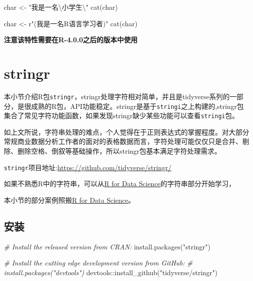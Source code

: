 \documentclass[
]{book}
\newenvironment{Shaded}{\begin{snugshade}}{\end{snugshade}}
\newcommand{\CommentTok}[1]{\textcolor[rgb]{0.56,0.35,0.01}{\textit{#1}}}
\newcommand{\FunctionTok}[1]{\textcolor[rgb]{0.00,0.00,0.00}{#1}}
\newcommand{\NormalTok}[1]{#1}
\newcommand{\OtherTok}[1]{\textcolor[rgb]{0.56,0.35,0.01}{#1}}
\newcommand{\SpecialCharTok}[1]{\textcolor[rgb]{0.00,0.00,0.00}{#1}}
\newcommand{\StringTok}[1]{\textcolor[rgb]{0.31,0.60,0.02}{#1}}
\begin{document}
\begin{Shaded}
\begin{Highlighting}[]
\NormalTok{char }\OtherTok{\textless{}{-}} \StringTok{"我是一名}\SpecialCharTok{\textbackslash{}\textquotesingle{}}\StringTok{小学生}\SpecialCharTok{\textbackslash{}\textquotesingle{}}\StringTok{"} 
\FunctionTok{cat}\NormalTok{(char)}

\NormalTok{char }\OtherTok{\textless{}{-}}\NormalTok{ r}\StringTok{"(我是一名\textquotesingle{}R语言\textquotesingle{}学习者)"}
\FunctionTok{cat}\NormalTok{(char)}
\end{Highlighting}
\end{Shaded}

\textbf{注意该特性需要在R-4.0.0之后的版本中使用}

\hypertarget{stringr}{%
\section{stringr}\label{stringr}}

本小节介绍R包\texttt{stringr}，stringr处理字符相对简单，并且是tidyverse系列的一部分，是很成熟的R包，API功能稳定。stringr是基于\texttt{stringi}之上构建的,stringr包集合了常见字符功能函数，如果发现stringr缺少某些功能可以查看\texttt{stringi}包。

如上文所说，字符串处理的难点，个人觉得在于正则表达式的掌握程度。对大部分常规商业数据分析工作者的面对的表格数据而言，字符处理可能仅仅只是合并、剔除、删除空格、倒叙等基础操作，所以stringr包基本满足字符处理需求。

\texttt{stringr}项目地址:\url{https://github.com/tidyverse/stringr/}

如果不熟悉R中的字符串，可以从\href{https://r4ds.had.co.nz/strings.html}{R for Data Science}的字符串部分开始学习，

本小节的部分案例照搬\href{https://r4ds.had.co.nz/strings.html}{R for Data Science}。

\hypertarget{ux5b89ux88c5-6}{%
\subsection{安装}\label{ux5b89ux88c5-6}}

\begin{Shaded}
\begin{Highlighting}[]
\CommentTok{\# Install the released version from CRAN:}
\FunctionTok{install.packages}\NormalTok{(}\StringTok{"stringr"}\NormalTok{)}

\CommentTok{\# Install the cutting edge development version from GitHub:}
\CommentTok{\# install.packages("devtools")}
\NormalTok{devtools}\SpecialCharTok{::}\FunctionTok{install\_github}\NormalTok{(}\StringTok{"tidyverse/stringr"}\NormalTok{)}
\end{Highlighting}
\end{Shaded}
\end{document}
